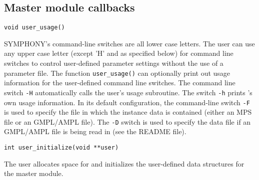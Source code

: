 
\subsection{Master module callbacks}

\bd


\label{user_usage}
\begin{verbatim}
void user_usage()
\end{verbatim}

\bd

\describe

SYMPHONY's command-line switches are all lower case letters. The user can use
any upper case letter (except 'H' and as specified below) for command line
switches to control user-defined parameter settings without the use of a
parameter file. The function {\tt user\_usage()} can optionally print out
usage information for the user-defined command line switches. The command line
switch {\tt -H} automatically calls the user's usage subroutine. The switch
{\tt -h} prints \BB's own usage information. In its default configuration, the
command-line switch \texttt{-F} is used to specify the file in which the
instance data is contained (either an MPS file or an GMPL/AMPL file). The
\texttt{-D} switch is used to specify the data file if an GMPL/AMPL file is
being read in (see the README file).

\ed

\vspace{1ex}

\begin{verbatim}
int user_initialize(void **user)
\end{verbatim}

\bd

\describe

The user allocates space for and initializes the user-defined
data structures for the master module.

\args


